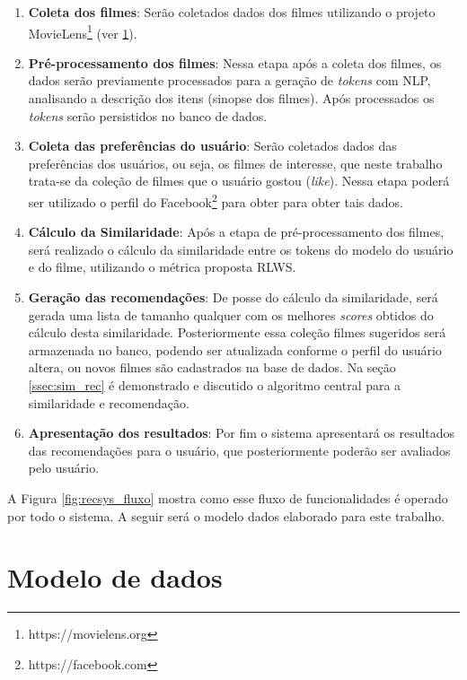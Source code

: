 \begin{enumerate}
	\item{\textbf{Coleta dos filmes}: Serão coletados dados dos filmes utilizando o projeto MovieLens\footnote{https://movielens.org} (ver \ref{sec:dataModel}).}
	
	\item{\textbf{Pré-processamento dos filmes}: Nessa etapa após a coleta dos filmes, os dados serão previamente processados para a geração de \textit{tokens} com \ac{NLP}, analisando a descrição dos itens (sinopse dos filmes). Após processados os \textit{tokens} serão persistidos no banco de dados.}
	
	\item{\textbf{Coleta das preferências do usuário}: Serão coletados dados das preferências dos usuários, ou seja, os filmes de interesse, que neste trabalho trata-se da coleção de filmes que o usuário gostou (\textit{like}). Nessa etapa poderá ser utilizado o perfil do Facebook\footnote{https://facebook.com} para obter para obter tais dados.}

	\item{\textbf{Cálculo da Similaridade}: Após a etapa de pré-processamento dos filmes, será realizado o cálculo da similaridade entre os tokens do modelo do usuário e do filme, utilizando o métrica proposta \ac{RLWS}.}
	
	\item{\textbf{Geração das recomendações}: De posse do cálculo da similaridade, será gerada uma lista de tamanho qualquer com os melhores \textit{scores} obtidos do cálculo desta similaridade. Posteriormente essa coleção filmes sugeridos será armazenada no banco, podendo ser atualizada conforme o perfil do usuário altera, ou novos filmes são cadastrados na base de dados. Na seção \ref{ssec:sim_rec} é demonstrado e discutido o algoritmo central para a similaridade e recomendação.}
	
	\item{\textbf{Apresentação dos resultados}: Por fim o sistema apresentará os resultados das recomendações para o usuário, que posteriormente poderão ser avaliados pelo usuário.}
\end{enumerate}

A Figura \ref{fig:recsys_fluxo} mostra como esse fluxo de funcionalidades é operado por todo o sistema. A seguir será o modelo dados elaborado para este trabalho.

\section{Modelo de dados}
\label{sec:dataModel}

